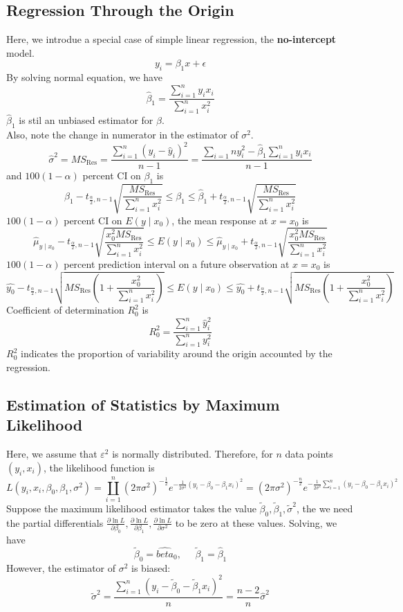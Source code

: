 \documentclass[11pt]{article}
\theoremstyle{definition}
\begin{document}
\subsection{Regression Through the Origin}
Here, we introdue a special case of simple linear regression, the \textbf{no-intercept} model.
\[
y_i = \beta_1x+\epsilon
\]
By solving normal equation, we have
\[
\hat{\beta}_1 = \frac{\sum_{i=1}^n y_ix_i}{\sum_{i=1}^n x_i^2}
\]
$\hat{\beta}_1$ is stil an unbiased estimator for $\beta$.\\
Also, note the change in numerator in the estimator of $\sigma^2$.
\[
\hat{\sigma}^2 = MS_\text{Res} = \frac{\sum_{i=1}^n (y_i-\hat{y}_i)^2}{n-1} = \frac{\sum_{i=1}n y_i^2 - \hat{\beta}_1 \sum_{i=1}^n y_ix_i}{n-1}
\]
and $100(1-\alpha)$ percent CI on $\beta_1$ is
\[
\hat{\beta}_1 - t_{\frac{\alpha}{2}, n-1} \sqrt{\frac{MS_\text{Res}}{\sum_{i=1}^n x_i^2}} \leq \beta_1\leq \hat{\beta}_1 + t_{\frac{\alpha}{2}, n-1} \sqrt{\frac{MS_\text{Res}}{\sum_{i=1}^n x_i^2}}
\]
$100(1-\alpha)$ percent CI on $E(y\mid x_0)$, the mean response at $x=x_0$ is
\[
\hat{\mu}_{y\mid x_0} - t_{\frac{\alpha}{2}, n-1}\sqrt{\frac{x_0^2 MS_\text{Res}}{\sum_{i=1}^n x_i^2}}\leq E(y\mid x_0) \leq \hat{\mu}_{y\mid x_0} + t_{\frac{\alpha}{2}, n-1}\sqrt{\frac{x_0^2 MS_\text{Res}}{\sum_{i=1}^n x_i^2}}
\]
$100(1-\alpha)$ percent prediction interval on a future observation at $x=x_0$ is
\[
\hat{y_0} - t_{\frac{\alpha}{2}, n-1}\sqrt{MS_\text{Res}(1+ \frac{x_0^2 }{\sum_{i=1}^n x_i^2})}\leq E(y\mid x_0) \leq 
\hat{y_0} + t_{\frac{\alpha}{2}, n-1}\sqrt{MS_\text{Res}(1+ \frac{x_0^2 }{\sum_{i=1}^n x_i^2})}
\]
Coefficient of determination $R_0^2$ is
\[
R_0^2 = \frac{\sum_{i=1}^n \hat{y}_i^2}{\sum_{i=1}^ny_i^2}
\]
$R_0^2$ indicates the proportion of variability around the origin accounted by the regression.
\subsection{Estimation of Statistics by Maximum Likelihood}
Here, we assume that $\varepsilon^2$ is normally distributed. Therefore, for $n$ data points $(y_i, x_i)$, the likelihood function is
\[
L(y_i,x_i,\beta_0,\beta_1,\sigma^2) = \coprod_{i=1}^n (2\pi\sigma^2)^{-\frac{1}{2}} e^{-\frac{1}{2\sigma^2}(y_i-\beta_0-\beta_1x_i)^2} = (2\pi\sigma^2)^{-\frac{n}{2}}e^{-\frac{1}{2\sigma^2}\sum_{i=1}^n (y_i-\beta_0-\beta_1x_i)^2}
\]
Suppose the maximum likelihood estimator takes the value $\tilde{\beta}_0, \tilde{\beta}_1, \tilde{\sigma}^2$, the we need the partial differentials $\frac{\partial \ln L}{\partial \beta_0},\frac{\partial \ln L}{\partial \beta_1}, \frac{\partial \ln L}{\partial \sigma^2}$ to be zero at these values. Solving, we have
\[
\tilde{\beta}_0 = \hat{beta}_0,\;\;\;\;\;\tilde{\beta}_1 = \hat{\beta}_1
\]
However, the estimator of $\sigma^2$ is biased:
\[
\tilde{\sigma}^2 = \frac{\sum_{i=1}^n (y_i-\tilde{\beta}_0-\tilde{\beta}_1x_i)^2}{n} = \frac{n-2}{n}\hat{\sigma}^2
\]
\end{document}
